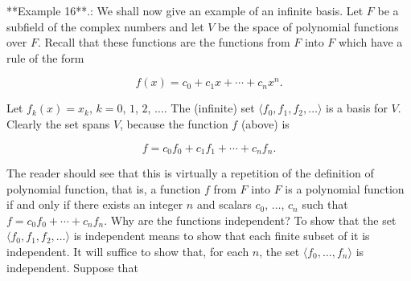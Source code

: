 

**Example 16**.: We shall now give an example of an infinite basis. Let \(F\) be a subfield of the complex numbers and let \(V\) be the space of polynomial functions over \(F\). Recall that these functions are the functions from \(F\) into \(F\) which have a rule of the form

\[f(x)=c_{0}+c_{1}x+\cdots+c_{n}x^{n}.\]

Let \(f_{k}(x)=x_{k}\), \(k=0\), \(1\), \(2\), \(\ldots\). The (infinite) set \(\langle f_{0},f_{1},f_{2},\ldots\rangle\) is a basis for \(V\). Clearly the set spans \(V\), because the function \(f\) (above) is

\[f=c_{0}f_{0}+c_{1}f_{1}+\cdots+c_{n}f_{n}.\]

The reader should see that this is virtually a repetition of the definition of polynomial function, that is, a function \(f\) from \(F\) into \(F\) is a polynomial function if and only if there exists an integer \(n\) and scalars \(c_{0}\), \(\ldots\), \(c_{n}\) such that \(f=c_{0}f_{0}+\cdots+c_{n}f_{n}\). Why are the functions independent? To show that the set \(\langle f_{0},f_{1},f_{2},\ldots\rangle\) is independent means to show that each finite subset of it is independent. It will suffice to show that, for each \(n\), the set \(\langle f_{0},\ldots,f_{n}\rangle\) is independent. Suppose that